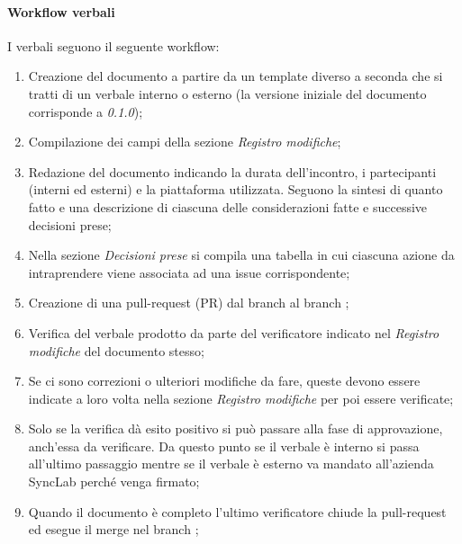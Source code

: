     \paragraph{Workflow verbali}
    I verbali seguono il seguente workflow:
    \begin{enumerate}
        \item Creazione del documento a partire da un template diverso a seconda che si tratti di un verbale interno o esterno (la versione iniziale del documento corrisponde a \textit{0.1.0});
        \item Compilazione dei campi della sezione \textit{Registro modifiche};
        \item Redazione del documento indicando la durata dell'incontro, i partecipanti (interni ed esterni) e la piattaforma utilizzata. Seguono la sintesi di quanto fatto e una descrizione di ciascuna 
        delle considerazioni fatte e successive decisioni prese;
        \item Nella sezione \textit{Decisioni prese} si compila una 
        tabella in cui ciascuna azione da intraprendere viene associata 
        ad una issue corrispondente;
        \item Creazione di una pull-request (PR) dal branch  al branch ;
        \item Verifica del verbale prodotto da parte del verificatore 
        indicato nel \textit{Registro modifiche} del documento stesso;
        \item Se ci sono correzioni o ulteriori modifiche da fare, queste 
        devono essere indicate a loro volta nella sezione \textit{Registro modifiche} per poi essere verificate;
        \item Solo se la verifica dà esito positivo si può passare alla fase di approvazione, anch'essa da verificare. \newline Da questo punto se il verbale è interno si passa all'ultimo passaggio mentre se il verbale è esterno va mandato all'azienda SyncLab perché venga firmato;
        \item Quando il documento è completo l'ultimo verificatore 
        chiude la pull-request ed esegue il merge nel branch ;
    \end{enumerate}

